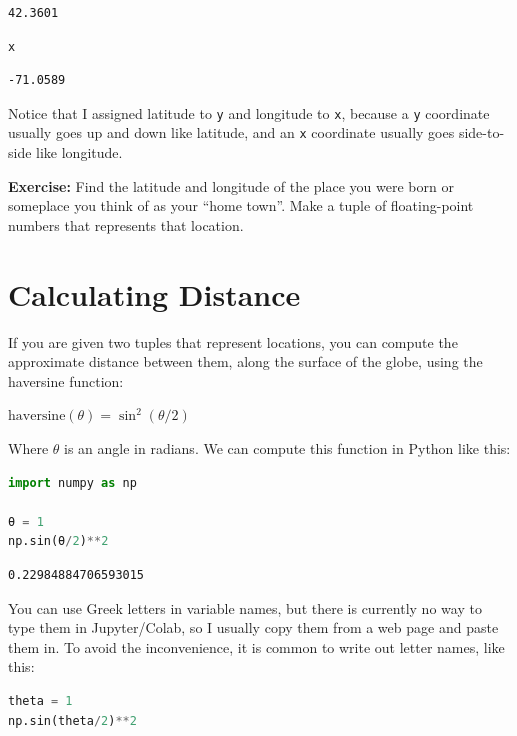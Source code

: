 \begin{lstlisting}[style=output]
42.3601
\end{lstlisting}

\begin{lstlisting}[language=Python,style=source]
x
\end{lstlisting}

\begin{lstlisting}[style=output]
-71.0589
\end{lstlisting}

Notice that I assigned latitude to \passthrough{\lstinline!y!} and
longitude to \passthrough{\lstinline!x!}, because a
\passthrough{\lstinline!y!} coordinate usually goes up and down like
latitude, and an \passthrough{\lstinline!x!} coordinate usually goes
side-to-side like longitude.

\textbf{Exercise:} Find the latitude and longitude of the place you were
born or someplace you think of as your ``home town''. Make a tuple of
floating-point numbers that represents that location.

\hypertarget{calculating-distance}{%
\section{Calculating Distance}\label{calculating-distance}}

If you are given two tuples that represent locations, you can compute
the approximate distance between them, along the surface of the globe,
using the haversine function:

\(\mathrm{haversine}(\theta)=\sin^2(\theta/2)\)

Where \(\theta\) is an angle in radians. We can compute this function in
Python like this:

\begin{lstlisting}[language=Python,style=source]
import numpy as np

θ = 1
np.sin(θ/2)**2
\end{lstlisting}

\begin{lstlisting}[style=output]
0.22984884706593015
\end{lstlisting}

You can use Greek letters in variable names, but there is currently no
way to type them in Jupyter/Colab, so I usually copy them from a web
page and paste them in. To avoid the inconvenience, it is common to
write out letter names, like this:

\begin{lstlisting}[language=Python,style=source]
theta = 1
np.sin(theta/2)**2
\end{lstlisting}

